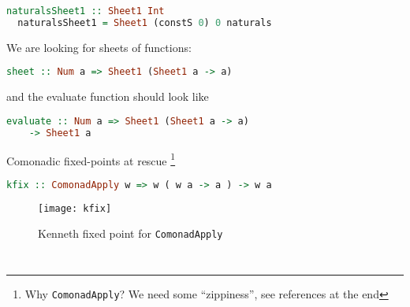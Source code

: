 \documentclass[10pt]{beamer}
\begin{document}
\begin{frame}[fragile]
  \begin{lstlisting}[language=haskell, basicstyle=\ttfamily]
  naturalsSheet1 :: Sheet1 Int
  naturalsSheet1 = Sheet1 (constS 0) 0 naturals
  \end{lstlisting}
\end{frame}

\begin{frame}[fragile]
  We are looking for sheets of functions:
  \begin{lstlisting}[language=haskell, basicstyle=\ttfamily]
  sheet :: Num a => Sheet1 (Sheet1 a -> a)
  \end{lstlisting}
  and the evaluate function should look like 
  \begin{lstlisting}[language=haskell, basicstyle=\ttfamily]
  evaluate :: Num a => Sheet1 (Sheet1 a -> a) 
    -> Sheet1 a 
  \end{lstlisting}
\end{frame}

\begin{frame}[fragile]
  Comonadic fixed-points at rescue%
  \footnote{Why \texttt{ComonadApply}? We need some ``zippiness'', see references at the end}
  \begin{lstlisting}[language=haskell, basicstyle=\ttfamily]
  kfix :: ComonadApply w => w ( w a -> a ) -> w a 
  \end{lstlisting}

\end{frame}
\begin{frame}[fragile]
  \begin{figure}
    \centering
    \texttt{[image: kfix]}
    \caption{Kenneth fixed point for \texttt{ComonadApply}}
  \end{figure}
\end{frame}

\begin{frame}[fragile]
  \begin{lstlisting}[language=haskell, basicstyle=\ttfamily]
  \end{lstlisting}
\end{frame}

\begin{frame}[fragile]
  \begin{lstlisting}[language=haskell, basicstyle=\ttfamily]
  \end{lstlisting}
\end{frame}
\end{document}
